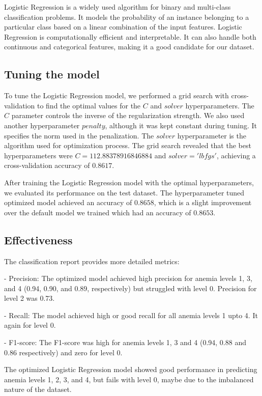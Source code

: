 Logistic Regression is a widely used algorithm for binary and multi-class classification problems. It models the probability of an instance belonging to a particular class based on a linear combination of the input features. Logistic Regression is computationally efficient and interpretable. It can also handle both continuous and categorical features, making it a good candidate for our dataset.

\subsection{Tuning the model}

To tune the Logistic Regression model, we performed a grid search with cross-validation to find the optimal values for the $C$ and $solver$ hyperparameters. The $C$ parameter controls the inverse of the regularization strength. We also used another hyperparameter $penalty$, although it was kept constant during tuning.  It specifies the norm used in the penalization. The $solver$ hyperparameter is the algorithm used for optimization process. The grid search revealed that the best hyperparameters were $C=112.88378916846884$ and $solver='lbfgs'$, achieving a cross-validation accuracy of $0.8617$.


After training the Logistic Regression model with the optimal hyperparameters, we evaluated its performance on the test dataset. The hyperparameter tuned optimized model achieved an accuracy of $0.8658$, which is a slight improvement over the default model we trained which had an accuracy of $0.8653$.


\subsection{Effectiveness}


The classification report provides more detailed metrics:

- Precision: The optimized model achieved high precision for anemia levels 1, 3, and 4 (0.94, 0.90, and 0.89, respectively) but struggled with level 0. Precision for level 2 was 0.73.


- Recall: The model achieved high or good recall for all anemia levels 1 upto 4. It again for level 0.


- F1-score: The F1-score was high for anemia levels 1, 3 and 4 (0.94, 0.88 and 0.86 respectively) and zero for level 0.

The optimized Logistic Regression model showed good performance in predicting anemia levels 1, 2, 3, and 4, but fails with level 0, maybe due to the imbalanced nature of the dataset.

